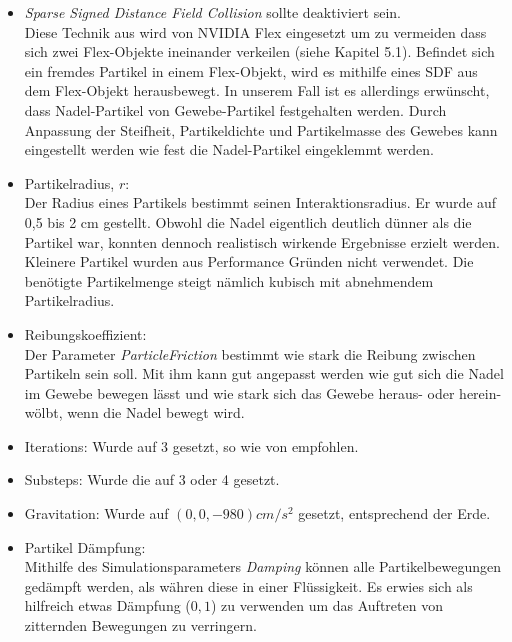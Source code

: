 \begin{itemize}

  \item \textit{Sparse Signed Distance Field Collision} sollte deaktiviert sein. \\ 
  Diese Technik aus wird von NVIDIA Flex eingesetzt um zu vermeiden dass sich zwei Flex-Objekte ineinander verkeilen (siehe \cite{UPP} Kapitel 5.1). Befindet sich ein fremdes Partikel in einem Flex-Objekt, wird es mithilfe eines \ac{SDF} aus dem Flex-Objekt herausbewegt. In unserem Fall ist es allerdings erwünscht, dass Nadel-Partikel von Gewebe-Partikel festgehalten werden. Durch Anpassung der Steifheit, Partikeldichte und Partikelmasse des Gewebes kann eingestellt werden wie fest die Nadel-Partikel eingeklemmt werden.    
    
     \item Partikelradius, $r$: \\ Der Radius eines Partikels bestimmt seinen Interaktionsradius. Er wurde auf 0,5 bis 2 cm gestellt. Obwohl die Nadel eigentlich deutlich dünner als die Partikel war, konnten dennoch realistisch wirkende Ergebnisse erzielt werden. Kleinere Partikel wurden aus Performance Gründen nicht verwendet. Die benötigte Partikelmenge steigt nämlich kubisch mit abnehmendem Partikelradius.
     
      \item Reibungskoeffizient: \\ Der Parameter \textit{ParticleFriction} bestimmt wie stark die Reibung zwischen Partikeln sein soll. Mit ihm kann gut angepasst werden wie gut sich die Nadel im Gewebe bewegen lässt und wie stark sich das Gewebe heraus- oder herein-wölbt, wenn die Nadel bewegt wird.
      
      \item Iterations: Wurde auf 3 gesetzt, so wie von \cite{UE4FlexDoc} empfohlen.
      
      \item Substeps:  Wurde die auf 3 oder 4 gesetzt. 
      
      \item Gravitation: Wurde auf $(0 , 0 , -980) cm/s^2$ gesetzt, entsprechend der Erde.
      
      \item Partikel Dämpfung: \\ Mithilfe des Simulationsparameters \textit{Damping} können alle Partikelbewegungen gedämpft werden, als währen diese in einer Flüssigkeit. Es erwies sich als hilfreich etwas Dämpfung ($0,1$) zu verwenden um das Auftreten von zitternden Bewegungen zu verringern.
      
\end{itemize}
    

